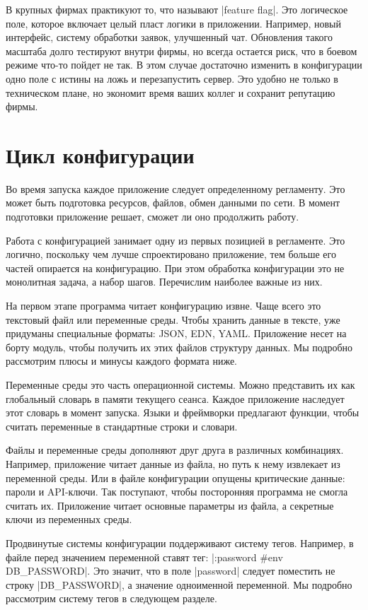 В крупных фирмах практикуют то, что называют \spverb|feature flag|. Это логическое
поле, которое включает целый пласт логики в приложении. Например, новый
интерфейс, систему обработки заявок, улучшенный чат. Обновления такого масштаба
долго тестируют внутри фирмы, но всегда остается риск, что в боевом режиме
что-то пойдет не так. В этом случае достаточно изменить в конфигурации одно поле
с истины на ложь и перезапустить сервер. Это удобно не только в техническом
плане, но экономит время ваших коллег и сохранит репутацию фирмы.

\section{Цикл конфигурации}

Во время запуска каждое приложение следует определенному регламенту. Это может
быть подготовка ресурсов, файлов, обмен данными по сети. В момент подготовки
приложение решает, сможет ли оно продолжить работу.

Работа с конфигурацией занимает одну из первых позицией в регламенте. Это
логично, поскольку чем лучше спроектировано приложение, тем больше его частей
опирается на конфигурацию. При этом обработка конфигурации это не монолитная
задача, а набор шагов. Перечислим наиболее важные из них.

На первом этапе программа читает конфигурацию извне. Чаще всего это текстовый
файл или переменные среды. Чтобы хранить данные в тексте, уже придуманы
специальные форматы: JSON, EDN, YAML. Приложение несет на борту модуль, чтобы
получить их этих файлов структуру данных. Мы подробно рассмотрим плюсы и минусы
каждого формата ниже.

Переменные среды это часть операционной системы. Можно представить их как
глобальный словарь в памяти текущего сеанса. Каждое приложение наследует этот
словарь в момент запуска. Языки и фреймворки предлагают функции, чтобы считать
переменные в стандартные строки и словари.

Файлы и переменные среды дополняют друг друга в различных комбинациях. Например,
приложение читает данные из файла, но путь к нему извлекает из переменной
среды. Или в файле конфигурации опущены критические данные: пароли и
API-ключи. Так поступают, чтобы посторонняя программа не смогла считать
их. Приложение читает основные параметры из файла, а секретные ключи из
переменных среды.

Продвинутые системы конфигурации поддерживают систему тегов. Например, в файле
перед значением переменной ставят тег: \spverb|:password #env DB_PASSWORD|. Это
значит, что в поле \spverb|password| следует поместить не строку
\spverb|DB_PASSWORD|, а значение одноименной переменной. Мы подробно рассмотрим
систему тегов в следующем разделе.

